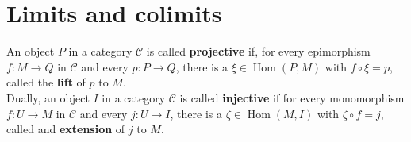 \begin{example}
\begin{enumerate}
    \end{enumerate}
\end{example}






\section{Limits and colimits}

An object $P$ in a category $\mathcal{C}$ is called \textbf{projective} if, for every epimorphism $f: M \rightarrow Q$ in $\mathcal{C}$ and every $p: P \rightarrow Q$, there is a $\xi \in \operatorname{Hom}(P, M)$ with $f \circ \xi=p$, called the \textbf{lift} of $p$ to $M$.\\
Dually, an object $I$ in a category $\mathcal{C}$ is called \textbf{injective} if for every monomorphism $f: U \rightarrow M$ in $\mathcal{C}$ and every $j: U \rightarrow I$, there is a $\zeta \in \operatorname{Hom}(M, I)$ with $\zeta \circ f=j$, called and \textbf{extension} of $j$ to $M$.\\
\medspace



